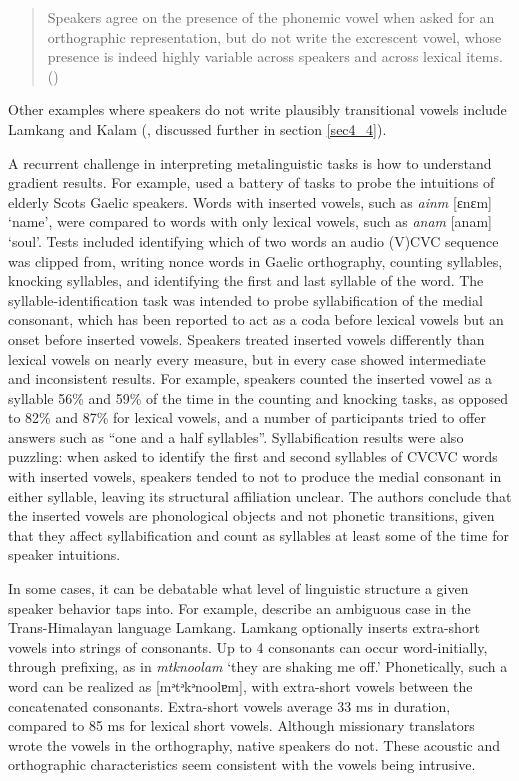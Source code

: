 \documentclass[output=paper,colorlinks,citecolor=brown]{langscibook}
\begin{document}
\begin{quote}
  Speakers agree on the presence of the phonemic vowel when asked for an orthographic representation, but do not write the excrescent vowel, whose presence is indeed highly variable across speakers and across lexical items. (\citealt[14]{tabain2022qaqet})  
\end{quote}


Other examples where speakers do not write plausibly transitional vowels include Lamkang \citep{Burkeetal2019} and Kalam (\citealt{Blevins&Pawley}, discussed further in section \ref{sec4_4}). 

A recurrent challenge in interpreting metalinguistic tasks is how to understand gradient results. For example, \citet{hammond2014vowel} used a battery of tasks to probe the intuitions of elderly Scots Gaelic speakers. Words with inserted vowels, such as \textit{ainm} [ɛnɛm] ‘name’, were compared to words with only lexical vowels, such as \textit{anam} [anam] ‘soul’. Tests included identifying which of two words an audio (V)CVC sequence was clipped from, writing nonce words in Gaelic orthography, counting syllables, knocking syllables, and identifying the first and last syllable of the word. The syllable-identification task was intended to probe syllabification of the medial consonant, which has been reported to act as a coda before lexical vowels but an onset before inserted vowels. Speakers treated inserted vowels differently than lexical vowels on nearly every measure, but in every case showed intermediate and inconsistent results. For example, speakers counted the inserted vowel as a syllable 56\% and 59\% of the time in the counting and knocking tasks, as opposed to 82\% and 87\% for lexical vowels, and a number of participants tried to offer answers such as “one and a half syllables”. Syllabification results were also puzzling: when asked to identify the first and second syllables of CVCVC words with inserted vowels, speakers tended to not to produce the medial consonant in either syllable, leaving its structural affiliation unclear. The authors conclude that the inserted vowels are phonological objects and not phonetic transitions, given that they affect syllabification and count as syllables at least some of the time for speaker intuitions. 

In some cases, it can be debatable what level of linguistic structure a given speaker behavior taps into. For example, \citet{Burkeetal2019} describe an ambiguous case in the Trans-Himalayan language Lamkang. Lamkang optionally inserts extra-short vowels into strings of consonants. Up to 4 consonants can occur word-initially, through prefixing, as in \textit{mtknoolam} ‘they are shaking me off.’ Phonetically, such a word can be realized as [mᵊtᵊkᵊnoolɐm], with extra-short vowels between the concatenated consonants. Extra-short vowels average 33 ms in duration, compared to 85 ms for lexical short vowels. Although missionary translators wrote the vowels in the orthography, native speakers do not. These acoustic and orthographic characteristics seem consistent with the vowels being intrusive. 
\end{document}
